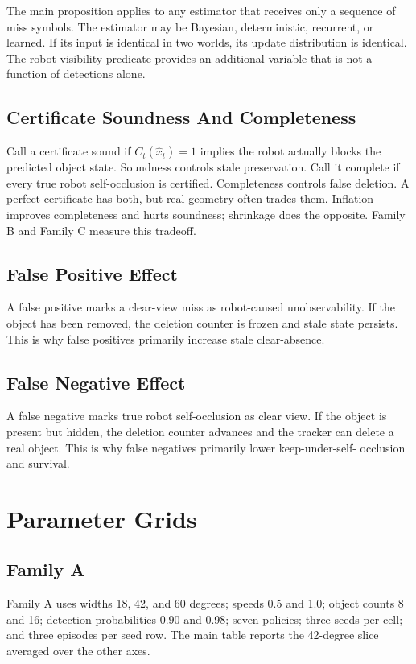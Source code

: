 \documentclass{article}
\begin{document}
The main proposition applies to any estimator that receives only a sequence of
miss symbols. The estimator may be Bayesian, deterministic, recurrent, or
learned. If its input is identical in two worlds, its update distribution is
identical. The robot visibility predicate provides an additional variable that
is not a function of detections alone.

\subsection{Certificate Soundness And Completeness}

Call a certificate sound if $C_t(\hat x_t)=1$ implies the robot actually blocks
the predicted object state. Soundness controls stale preservation. Call it
complete if every true robot self-occlusion is certified. Completeness controls
false deletion. A perfect certificate has both, but real geometry often trades
them. Inflation improves completeness and hurts soundness; shrinkage does the
opposite. Family B and Family C measure this tradeoff.

\subsection{False Positive Effect}

A false positive marks a clear-view miss as robot-caused unobservability. If the
object has been removed, the deletion counter is frozen and stale state
persists. This is why false positives primarily increase stale clear-absence.

\subsection{False Negative Effect}

A false negative marks true robot self-occlusion as clear view. If the object is
present but hidden, the deletion counter advances and the tracker can delete a
real object. This is why false negatives primarily lower keep-under-self-
occlusion and survival.

\section{Parameter Grids}

\subsection{Family A}
Family A uses widths 18, 42, and 60 degrees; speeds 0.5 and 1.0; object counts
8 and 16; detection probabilities 0.90 and 0.98; seven policies; three seeds
per cell; and three episodes per seed row. The main table reports the
42-degree slice averaged over the other axes.
\end{document}
